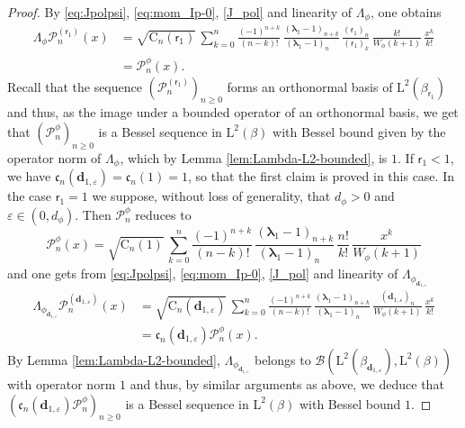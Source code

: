 \documentclass[JEP,XML,SOM,Unicode]{cedram}
\let\epsilon\varepsilon
\theoremstyle{plain}
\theoremstyle{definition}
\renewcommand{\P}{\mathcal{P}}
\newcommand{\C}{{\mathrm{C}}}
\newcommand{\Leb}{\mathrm{L}}
\newcommand{\dz}{{\bm{d}}_{1,\epsilon}}
\newcommand{\Bop}[2]{\mathcal{B}(#1,#2)}
\newcommand{\lam}{{\bm{\lambda}_1}}
\newcommand{\vat}{{\mathsf{r}_1}}
\newcommand{\gab}[1][\lam,\mo]{{\beta_{#1}}}
\let\mo\mu
\let\bpsi\beta
\begin{document}
\begin{proof}
By \eqref{eq:Jpolpsi}, \eqref{eq:mom_Ip-0}, \eqref{J_pol} and linearity of $\Lambda_{\phi}$, one obtains
\begin{equation}
\label{eq:LambdaP}
\begin{split}
\Lambda_\phi \P_n^{(\vat)}(x) &= \sqrt{\C_n(\vat)}\, \sum_{k=0}^n \frac{(-1)^{n+k}}{(n-k)!}\, \frac{(\lam-1)_{n+k}}{(\lam-1)_{n\phantom{+k}}}\, \frac{(\vat)_n}{(\vat)_k}\, \frac{k!}{W_\phi(k+1)}\, \frac{x^k}{k!}\\
&= \P_n^\phi(x).
\end{split}
\end{equation}
Recall that the sequence $(\P_n^{(\vat)})_{n \geq 0}$ forms an orthonormal basis of $\Leb^2(\gab[\vat])$ and thus, as the image under a bounded operator of an orthonormal basis, we get that $(\P_n^\phi)_{n \geq 0}$ is a Bessel sequence in $\Leb^2(\bpsi)$ with Bessel bound given by the operator norm of $\Lambda_\phi$, which by Lemma \ref{lem:Lambda-L2-bounded}, is $1$. If $\vat <1$, we have $\mathfrak{c}_n(\dz) = \mathfrak{c}_n(1) =1$, so that the first claim is proved in this case. In the case $\vat = 1$ we suppose, without loss of generality, that $d_\phi > 0$ and $\epsilon \in (0,d_\phi)$. Then $\P_n^\phi$ reduces to
\begin{equation*}
\P_n^\phi(x) = \sqrt{\C_n(1)}\, \sum_{k=0}^n \frac{(-1)^{n+k}}{(n-k)!} \,\frac{(\lam-1)_{n+k}}{(\lam-1)_{n\phantom{+k}}}\, \frac{n!}{k!}\, \frac{x^k}{W_{\phi}(k+1)}
\end{equation*}
and one gets from \eqref{eq:Jpolpsi}, \eqref{eq:mom_Ip-0}, \eqref{J_pol} and linearity of $\Lambda_{\phi_{\dz}}$
\begin{align*}
\Lambda_{\phi_{\dz}} \P_n^{(\dz)} (x)
&= \sqrt{\C_n(\dz)}\, \sum_{k=0}^n \frac{(-1)^{n+k}}{(n-k)!}\, \frac{(\lam-1)_{n+k}}{(\lam-1)_{n\phantom{+k}}} \,\frac{(\dz)_n}{W_\phi(k+1)}\, \frac{x^k}{k!}\\
&= \mathfrak{c}_n(\dz)\P^{\phi}_n(x).
\end{align*}
By Lemma \ref{lem:Lambda-L2-bounded}, $\Lambda_{\phi_{\dz}}$ belongs to $\Bop{\Leb^2(\gab[\dz])}{\Leb^2(\bpsi)}$ with operator norm $1$ and thus, by similar arguments as above, we deduce that $(\mathfrak{c}_n(\dz)\P^{\phi}_n)_{n \geq 0}$ is a Bessel sequence in $\Leb^2(\bpsi)$ with Bessel bound $1$.


\end{proof}
\end{document}
